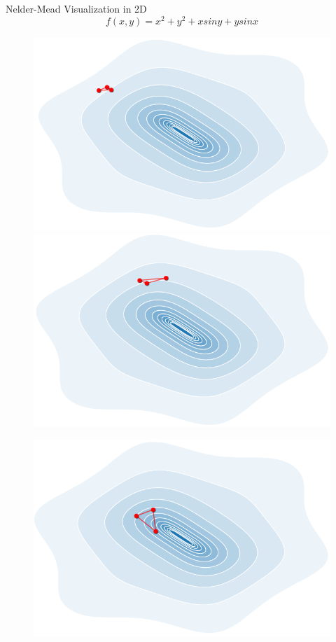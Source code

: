 \documentclass[11pt,compress,t,notes=noshow, xcolor=table]{beamer}
\begin{document}
\begin{vbframe}{Nelder-Mead Visualization in 2D}
\vspace*{-0.5cm}
$$f(x,y) = x^{2} + y^{2} + xsiny + ysinx $$ 
\vspace*{-0.5cm}
\begin{figure}
    \centering
    \begin{minipage}{0.45\textwidth}
        \centering
        \includegraphics[width = 0.75\linewidth]{figure_man/nm_animation2d_1.PNG}
    \end{minipage}\hfill
    \begin{minipage}{0.45\textwidth}
        \centering
        \includegraphics[width = 0.75\linewidth]{figure_man/nm_animation2d_2.PNG}
    \end{minipage}
\end{figure}
\vspace*{-0.5cm}
\begin{figure}
    \centering
    \begin{minipage}{0.45\textwidth}
        \centering
        \includegraphics[width = 0.75\linewidth]{figure_man/nm_animation2d_3.PNG}

\end{minipage}
\end{figure}
\end{vbframe}
\end{document}
